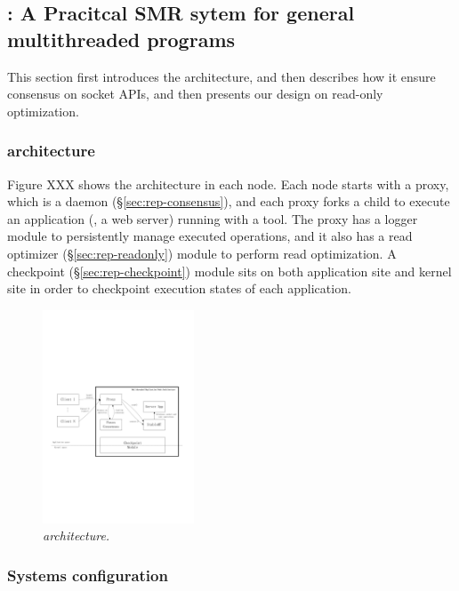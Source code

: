 \subsection{\msmr: A Pracitcal SMR sytem for general multithreaded programs} \label{sec:rep-msmr}
This section first introduces the \msmr architecture, and then describes how it 
ensure consensus on socket APIs, and then presents our design on read-only 
optimization.

\subsubsection{\msmr architecture} \label{sec:rep-arch}

Figure XXX shows the \msmr architecture in each node. Each node starts with a proxy, 
which is a \paxos daemon (\S\ref{sec:rep-consensus}), and each proxy forks a child to execute an 
application (\eg, a web server) running with a \smt tool. The proxy has a logger module to 
persistently manage executed operations, and it also has a read optimizer (\S\ref{sec:rep-readonly})
module to perform read optimization. A checkpoint (\S\ref{sec:rep-checkpoint}) module sits on both 
application site and kernel site in order to checkpoint execution states of each application.

\begin{figure}[t]
\centering
\includegraphics[width=0.4\textwidth]{figures/architecture}
\vspace{-.05in}
\caption{{\em \msmr architecture.}} \label{fig:arch}
\vspace{-.05in}
\end{figure}


\subsubsection{Systems configuration} \label{sec:rep-config}

